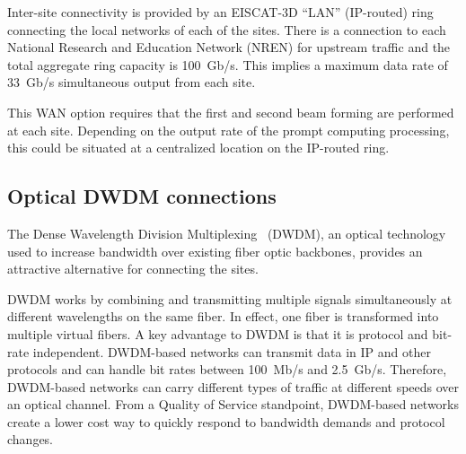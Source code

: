 \documentclass[12pt,a4paper]{article}
\begin{document}
Inter-site connectivity is provided by an EISCAT-3D ``LAN'' (IP-routed) ring connecting the local networks of each of the sites.
There is a connection to each National Research and Education Network (NREN) for upstream traffic and the total aggregate ring capacity is 100~Gb/s.
This implies a maximum data rate of 33~Gb/s simultaneous output from each site.

This WAN option requires that the first and second beam forming are performed at each site.
Depending on the output rate of the prompt computing processing, this could be situated at a centralized location on the IP-routed ring.

\subsection{Optical DWDM connections}
\label{ssec:optical}

The Dense Wavelength Division Multiplexing~\cite{dwdm} (DWDM), an optical technology used to increase bandwidth over existing fiber optic backbones, provides an attractive alternative for connecting the \ED sites.

DWDM works by combining and transmitting multiple signals simultaneously at different wavelengths on the same fiber. 
In effect, one fiber is transformed into multiple virtual fibers. 
A key advantage to DWDM is that it is protocol and bit-rate independent. 
DWDM-based networks can transmit data in IP and other protocols and can handle bit rates between 100~Mb/s and 2.5~Gb/s. 
Therefore, DWDM-based networks can carry different types of traffic at different speeds over an optical channel.
From a Quality of Service standpoint, DWDM-based networks create a lower cost way to quickly respond to bandwidth demands and protocol changes.
\end{document}
